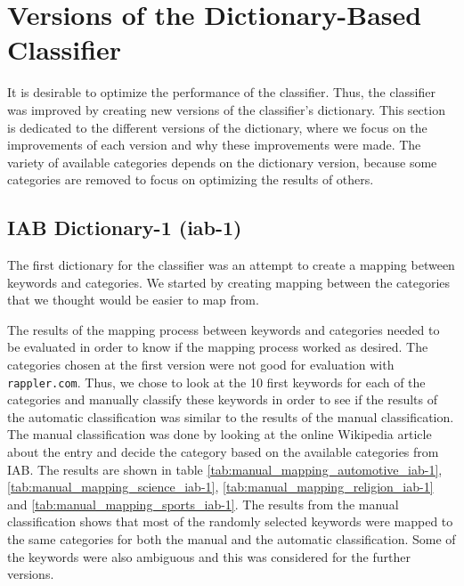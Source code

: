 \section{Versions of the Dictionary-Based Classifier}
It is desirable to optimize the performance of the  classifier. Thus, the classifier was improved by creating new versions of the classifier's dictionary. This section is dedicated to the different versions of the dictionary, where we focus on the improvements of each version and why these improvements were made. The variety of available categories depends on the dictionary version, because some categories are removed to focus on optimizing the results of others. %

\subsection{IAB Dictionary-1 (iab-1)}
The first dictionary for the classifier was an attempt to create a mapping between keywords and categories. We started by creating mapping between the categories that we thought would be easier to map from. 

The results of the mapping process between keywords and categories needed to be evaluated in order to know if the mapping process worked as desired. The categories chosen at the first version were not good for evaluation with \texttt{rappler.com}. Thus, we chose to look at the 10 first keywords for each of the categories and manually classify these keywords in order to see if the results of the automatic classification was similar to the results of the manual classification. The manual classification was done by looking at the online Wikipedia article about the entry and decide the category based on the available categories from IAB. The results are shown in table \ref{tab:manual_mapping_automotive_iab-1}, \ref{tab:manual_mapping_science_iab-1}, \ref{tab:manual_mapping_religion_iab-1} and \ref{tab:manual_mapping_sports_iab-1}. The results from the manual classification shows that most of the randomly selected keywords were mapped to the same categories for both the manual and the automatic classification. Some of the keywords were also ambiguous and this was considered for the further versions. 

